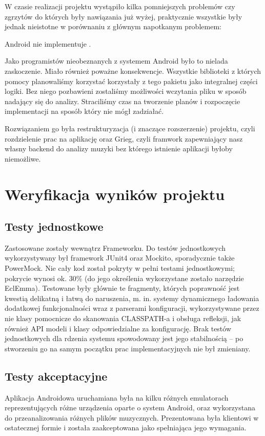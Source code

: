 W czasie realizacji projektu wystąpiło kilka pomniejszych problemów czy zgrzytów do których były nawiązania już wyżej, praktycznie wszystkie były jednak nieistotne w porównaniu z głównym napotkanym problemem:

Android nie implementuje .

Jako programistów nieobeznanych z systemem Android było to nielada zaskoczenie. Miało również poważne konsekwencje. Wszystkie biblioteki z których pomocy planowaliśmy korzystać korzystały z tego pakietu jako integralnej części logiki. Bez niego pozbawieni zostaliśmy możliwości wczytania pliku w sposób nadający się do analizy. Straciliśmy czas na tworzenie planów i rozpoczęcie implementacji na sposób który nie mógł zadziałać.

Rozwiązaniem go była restrukturyzacja (i znaczące rozszerzenie) projektu, czyli rozdzielenie prac na aplikację oraz Grieg, czyli framwork zapewniający nasz własny backend do analizy muzyki bez którego istnienie aplikacji byłoby niemożliwe.

\chapter{Weryfikacja wyników projektu}

\section{Testy jednostkowe}
Zastosowane zostały wewnątrz Frameworku. Do testów jednostkowych wykorzystywany był framework JUnit4 oraz Mockito, sporadycznie także
PowerMock. Nie cały kod został pokryty w pełni testami jednostkowymi; pokrycie wynosi ok. 30\% (do
jego określenia wykorzystane zostało narzędzie EclEmma). Testowane były głównie te fragmenty,
których poprawność jest kwestią delikatną i łatwą do naruszenia, m. in. systemy dynamicznego
ładowania dodatkowej funkcjonalności wraz z parserami konfiguracji, wykorzystywane przez nie klasy
pomocnicze do skanowania CLASSPATH-a i obsługa refleksji, jak również API modeli i klasy
odpowiedzialne za konfigurację. Brak testów jednostkowych dla rdzenia systemu spowodowany jest jego
stabilnością -- po stworzeniu go na samym początku prac implementacyjnych nie był zmieniany.

\section{Testy akceptacyjne}
Aplikacja Androidowa uruchamiana była na kilku różnych emulatorach reprezentujących różne urządzenia oparte o system Android, oraz wykorzystana do przeanalizowania różnych plików muzycznych. Prezentowana była klientowi w ostatecznej formie i została zaakceptowana jako spełniająca jego wymagania.

